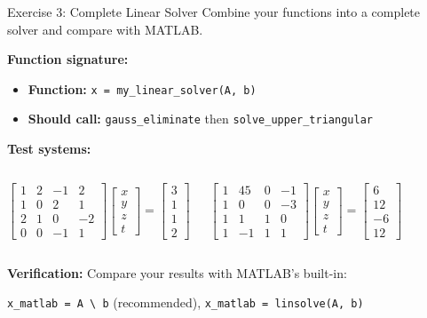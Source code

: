 \documentclass[aspectratio=169]{beamer}
\begin{document}
\begin{frame}{Exercise 3: Complete Linear Solver}
	\textcolor{NavyBlue}{Combine your functions into a complete solver and compare with MATLAB.}

	\vspace{0.15cm}
	\textbf{Function signature:}
	\begin{itemize}
		\item \textbf{Function:} \texttt{x = my\_linear\_solver(A, b)}
		\item \textbf{Should call:} \texttt{gauss\_eliminate} then \texttt{solve\_upper\_triangular}
	\end{itemize}

	\vspace{0.15cm}
	\textbf{Test systems:}
	\begin{columns}
		\small{\begin{equation*}
				\begin{bmatrix}
					1 & 2 & -1 & 2  \\
					1 & 0 & 2  & 1  \\
					2 & 1 & 0  & -2 \\
					0 & 0 & -1 & 1
				\end{bmatrix}
				\begin{bmatrix} x \\ y \\ z \\ t \end{bmatrix} =
				\begin{bmatrix} 3 \\ 1 \\ 1 \\ 2 \end{bmatrix}
			\end{equation*}}

		\small{\begin{equation*}
				\begin{bmatrix}
					1 & 45 & 0 & -1 \\
					1 & 0  & 0 & -3 \\
					1 & 1  & 1 & 0  \\
					1 & -1 & 1 & 1
				\end{bmatrix}
				\begin{bmatrix} x \\ y \\ z \\ t \end{bmatrix} =
				\begin{bmatrix} 6 \\ 12 \\ -6 \\ 12 \end{bmatrix}
			\end{equation*}}
	\end{columns}

	\vspace{0.15cm}
	\small{
		\textbf{Verification:} Compare your results with MATLAB's built-in:

		\vspace{0.15cm}
		\texttt{x\_matlab = A \textbackslash~b} (recommended), \texttt{x\_matlab = linsolve(A, b)}
	}
\end{frame}
\end{document}
